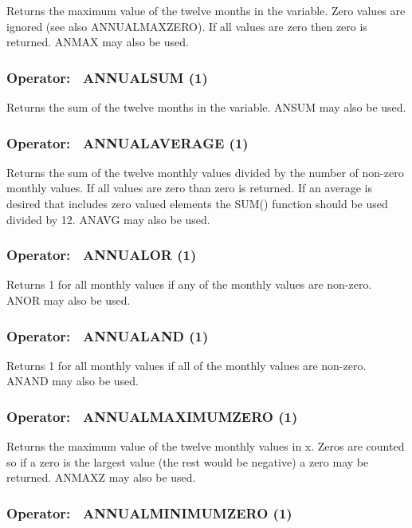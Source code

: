 Returns the maximum value of the twelve months in the variable. Zero values are ignored (see also ANNUALMAXZERO). If all values are zero then zero is returned. ANMAX may also be used.

\subsubsection{Operator:~ ANNUALSUM (1)}\label{operator-annualsum-1}

Returns the sum of the twelve months in the variable. ANSUM may also be used.

\subsubsection{Operator:~ ANNUALAVERAGE (1)}\label{operator-annualaverage-1}

Returns the sum of the twelve monthly values divided by the number of non-zero monthly values. If all values are zero than zero is returned. If an average is desired that includes zero valued elements the SUM() function should be used divided by 12. ANAVG may also be used.

\subsubsection{Operator:~ ANNUALOR (1)}\label{operator-annualor-1}

Returns 1 for all monthly values if any of the monthly values are non-zero. ANOR may also be used.

\subsubsection{Operator:~ ANNUALAND (1)}\label{operator-annualand-1}

Returns 1 for all monthly values if all of the monthly values are non-zero. ANAND may also be used.

\subsubsection{Operator:~ ANNUALMAXIMUMZERO (1)}\label{operator-annualmaximumzero-1}

Returns the maximum value of the twelve monthly values in x. Zeros are counted so if a zero is the largest value (the rest would be negative) a zero may be returned. ANMAXZ may also be used.

\subsubsection{Operator:~ ANNUALMINIMUMZERO (1)}\label{operator-annualminimumzero-1}

